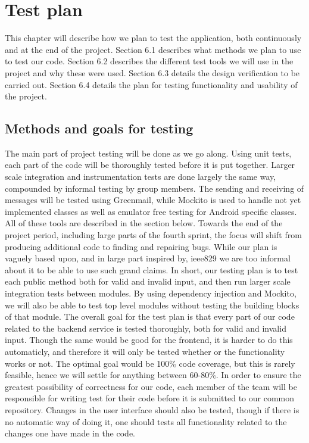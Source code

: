 \chapter{Test plan}\label{chapter_test}

This chapter will describe how we plan to test the application, both continuously and at the end of the project. Section 6.1 describes what methods we plan to use to test our code. Section 6.2 describes the different test tools we will use in the project and why these were used. Section 6.3 details the design verification to be carried out. Section 6.4 details the plan for testing functionality and usability of the project. 

\section{Methods and goals for testing}

The main part of project testing will be done as we go along. Using unit tests, each part of the code will be thoroughly tested before it is put together. Larger scale integration and instrumentation tests are done largely the same way, compounded by informal testing by group members. The sending and receiving of messages will be tested using Greenmail, while Mockito is used to handle not yet implemented classes as well as emulator free testing for Android specific classes. All of these tools are described in the section below. Towards the end of the project period, including large parts of the fourth sprint, the focus will shift from producing additional code to finding and repairing bugs. While our plan is vaguely based upon, and in large part inspired by, \gls{ieee829} \cite{bib:ieee} we are too informal about it to be able to use such grand claims. In short, our testing plan is to test each public method both for valid and invalid input, and then run larger scale integration tests between modules.
By using dependency injection and Mockito, we will also be able to test top level modules without testing the building blocks of that module. 
\newline
\newline
The overall goal for the test plan is that every part of our code related to the backend service is tested thoroughly, both for valid and invalid input. Though the same would be good for the frontend,
it is harder to do this automaticly, and therefore it will only be tested whether or the functionality works or not. The optimal goal would be 100\% code coverage, but this is rarely feasible, hence
we will settle for anything between 60-80\%. 
\newline
\newline
In order to ensure the greatest possibility of correctness for our code, each member of the team will be responsible for writing test for their code before it is submitted to our common repository.
Changes in the user interface should also be tested, though if there is no automatic way of doing it, one should tests all functionality related to the changes one have made in the code. 



